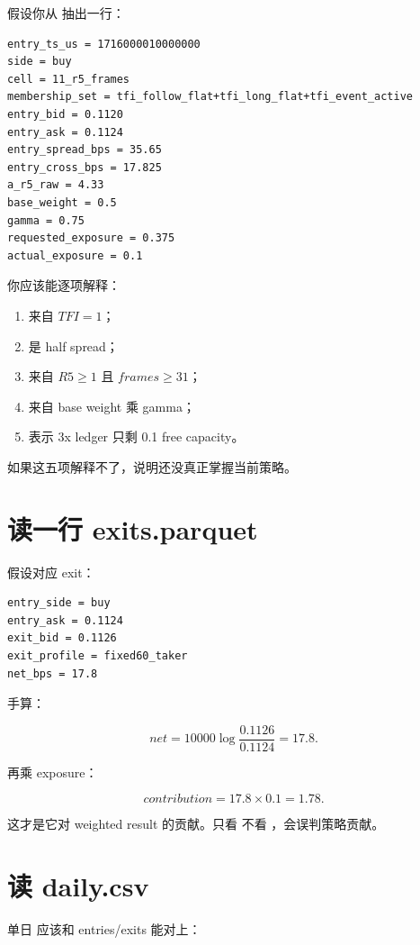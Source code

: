 假设你从  抽出一行：

\begin{lstlisting}
entry_ts_us = 1716000010000000
side = buy
cell = 11_r5_frames
membership_set = tfi_follow_flat+tfi_long_flat+tfi_event_active
entry_bid = 0.1120
entry_ask = 0.1124
entry_spread_bps = 35.65
entry_cross_bps = 17.825
a_r5_raw = 4.33
base_weight = 0.5
gamma = 0.75
requested_exposure = 0.375
actual_exposure = 0.1
\end{lstlisting}

你应该能逐项解释：

\begin{enumerate}[leftmargin=2em]
  \item {} 来自 \(TFI=1\)；
  \item {} 是 half spread；
  \item {} 来自 \(R5\ge1\) 且 \(frames\ge31\)；
  \item {} 来自 base weight 乘 gamma；
  \item {} 表示 3x ledger 只剩 0.1 free capacity。
\end{enumerate}

如果这五项解释不了，说明还没真正掌握当前策略。

\section{读一行 exits.parquet}

假设对应 exit：

\begin{lstlisting}
entry_side = buy
entry_ask = 0.1124
exit_bid = 0.1126
exit_profile = fixed60_taker
net_bps = 17.8
\end{lstlisting}

手算：

\[
net=10000\log\frac{0.1126}{0.1124}=17.8.
\]

再乘 exposure：

\[
contribution=17.8\times0.1=1.78.
\]

这才是它对 weighted result 的贡献。只看  不看 ，会误判策略贡献。

\section{读 daily.csv}

单日  应该和 entries/exits 能对上：

